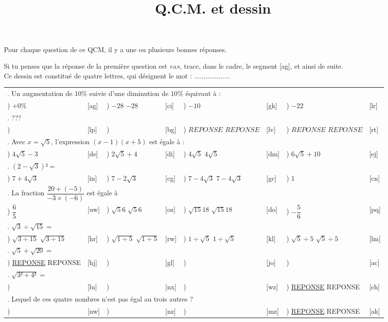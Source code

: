 \documentclass[
	classe=$2^{de}$,
	exercices=Exercices\space chapitre\space 1
]{exercice}
\title{{\huge Q.C.M. et dessin}}
\author{}
\date{}
\newcounter{QCMQuestionCounter}
\newcounter{QCMReponseCounter}
\newcommand{\QCMQuestion}[1]{
	\hline\multicolumn{8}{l}{\arabic{QCMQuestionCounter}. #1}\stepcounter{QCMQuestionCounter} \\
}
\newcommand{\QCMReponse}[8]{
	\setcounter{QCMReponseCounter}{1}         \alph{QCMReponseCounter}) #1 & [#2] & \stepcounter{QCMReponseCounter}           \alph{QCMReponseCounter}) #3 & [#4] & \stepcounter{QCMReponseCounter}           \alph{QCMReponseCounter}) #5 & [#6] & \stepcounter{QCMReponseCounter}           \alph{QCMReponseCounter}) #7 & [#8] \\
}
\newcommand{\QCMJuste}[1]{
\ifdefined\makeCorrection
\uline{#1}
\else
#1
\fi
}
\begin{document}
\maketitle

\begin{minipage}{0.5\linewidth}
	Pour chaque question de ce QCM, il y a une ou plusieurs bonnes réponses.

	Si tu penses que la réponse de la première question est «a», trace, dans le cadre, le segment [ag], et ainsi de suite. \\

	Ce dessin est constitué de quatre lettres, qui désignent le mot : ...................
\end{minipage}
\hspace{0.08\linewidth}
\begin{minipage}{0.4\linewidth}
	\newcommand{\placePoint}[2]{
		#1 * \linewidth / 4.8 - \linewidth / 8, \linewidth - #2 * \linewidth / 4.8 + \linewidth / 8
	}

\end{minipage}

\vspace{1em}

\begin{tabular}{llllllll}
	\QCMQuestion{Un augmentation de $10\%$ suivie d'une diminution de $10\%$ équivaut à :}
	\QCMReponse{$+0\%$}{ag}{\QCMJuste{$-28$}}{ci}{$-10$}{gk}{$-22$}{lr}
	\QCMQuestion{???}
	\QCMReponse{$ $}{lp}{$ $}{bg}{\QCMJuste{$REPONSE$}}{lv}{\QCMJuste{$REPONSE$}}{rt}
	\QCMQuestion{Avec $x=\sqrt{5}$, l'expression $(x-1)(x+5)$ est égale à :}
	\QCMReponse{$4\sqrt{5} - 3$}{de}{$2\sqrt{5} + 4$}{di}{\QCMJuste{$4\sqrt{5}$}}{dm}{$6\sqrt{5} + 10$}{ej}
	\QCMQuestion{$(2 - \sqrt{3})² =$}
	\QCMReponse{$7+4\sqrt{3}$}{in}{$7-2\sqrt{3}$}{cg}{\QCMJuste{$7-4\sqrt{3}$}}{gc}{$1$}{cn}
	\QCMQuestion{La fraction $\dfrac{20 + (-5)}{-3 × (-6)}$ est égale à}
	\QCMReponse{$\dfrac{6}{5}$}{uw}{\QCMJuste{$\sqrt{5}{6}$}}{oz}{\QCMJuste{$\sqrt{15}{18}$}}{do}{$-\dfrac{5}{6}$}{pq}
	\QCMQuestion{$\sqrt{3} ÷ \sqrt{15} =$}
	\QCMReponse{\QCMJuste{$\sqrt{3 ÷ 15}$}}{hr}{\QCMJuste{$\sqrt{1 ÷ 5}$}}{rw}{\QCMJuste{$1 ÷ \sqrt{5}$}}{kl}{\QCMJuste{$\sqrt{5} ÷ 5$}}{lm}
	\QCMQuestion{$\sqrt{5}+\sqrt{20} =$}
	\QCMReponse{\QCMJuste{REPONSE}}{hj}{}{gl}{}{jo}{}{ac}
	\QCMQuestion{$\sqrt{3² + 4²} =$}
	\QCMReponse{}{lu}{}{nx}{}{wz}{\QCMJuste{REPONSE}}{ch}
	\QCMQuestion{Lequel de ces quatre nombres n'est pas égal au trois autres ?}
	\QCMReponse{}{nw}{}{nz}{}{mz}{\QCMJuste{REPONSE}}{ak}
\end{tabular}
\end{document}
